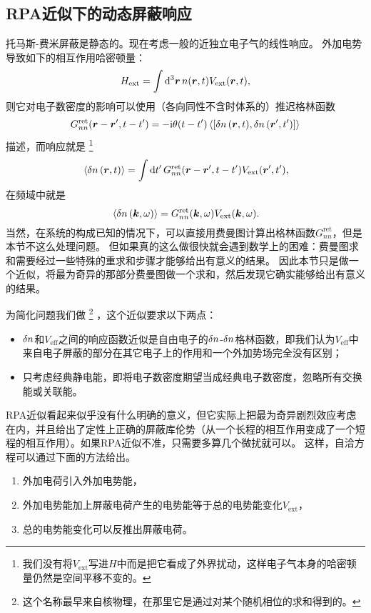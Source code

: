 \subsection{RPA近似下的动态屏蔽响应}

托马斯-费米屏蔽是静态的。现在考虑一般的近独立电子气的线性响应。
外加电势导致如下的相互作用哈密顿量：
\[
    {H}_\text{ext} = \int \dd[3]{\vb*{r}} {n}(\vb*{r}, t) V_\text{ext} (\vb*{r}, t),
\]
则它对电子数密度的影响可以使用（各向同性不含时体系的）推迟格林函数
\[
    G^\text{ret}_{nn}(\vb*{r}-\vb*{r}', t-t') = - \ii \theta(t-t') \expval*{\comm{\var{{n}}(\vb*{r}, t)}{\var{{n}}(\vb*{r}', t')}}
\]
描述，而响应就是%
\footnote{我们没有将$V_\text{ext}$写进${H}$中而是把它看成了外界扰动，这样电子气本身的哈密顿量仍然是空间平移不变的。}%
\begin{equation}
    \expval*{\var{{n}}(\vb*{r}, t)} = \int \dd{t'} G^\text{ret}_{nn}(\vb*{r}-\vb*{r}', t-t') V_\text{ext}(\vb*{r}', t'),
\end{equation}
在频域中就是
\begin{equation}
    \expval*{\var{{n}}(\vb*{k}, \omega)} = G^\text{ret}_{nn}(\vb*{k}, \omega) V_\text{ext}(\vb*{k}, \omega).
    \label{eq:green-function-electro-shielding}
\end{equation}
当然，在系统的构成已知的情况下，可以直接用费曼图计算出格林函数$G^\text{ret}_{nn}$，但是本节不这么处理问题。
但如果真的这么做很快就会遇到数学上的困难：费曼图求和需要经过一些特殊的重求和步骤才能够给出有意义的结果。
因此本节只是做一个近似，将最为奇异的那部分费曼图做一个求和，然后发现它确实能够给出有意义的结果。

为简化问题我们做%
\footnote{这个名称最早来自核物理，在那里它是通过对某个随机相位的求和得到的。}%
，这个近似要求以下两点：
\begin{itemize}
    \item $\var{{n}}$和$V_\text{eff}$之间的响应函数近似是自由电子的$\var{{n}}$-$\var{{n}}$格林函数，即我们认为$V_\text{eff}$中来自电子屏蔽的部分在其它电子上的作用和一个外加势场完全没有区别；
    \item 只考虑经典静电能，即将电子数密度期望当成经典电子数密度，忽略所有交换能或关联能。
\end{itemize}
RPA近似看起来似乎没有什么明确的意义，但它实际上把最为奇异剧烈效应考虑在内，并且给出了定性上正确的屏蔽库伦势（从一个长程的相互作用变成了一个短程的相互作用）。如果RPA近似不准，只需要多算几个微扰就可以。
这样，自洽方程可以通过下面的方法给出。
\begin{enumerate}
    \item 外加电荷引入外加电势能，
    \item 外加电势能加上屏蔽电荷产生的电势能等于总的电势能变化$V_\text{ext}$，
    \item 总的电势能变化可以反推出屏蔽电荷。
\end{enumerate}

